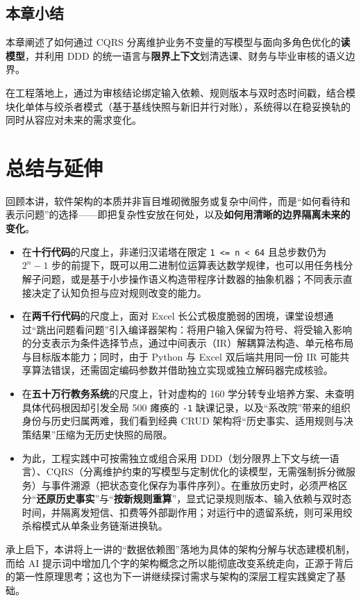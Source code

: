 \documentclass[UTF8,a4paper,11pt,fontset=fandol]{ctexart}
\begin{document}
\subsection{本章小结}

本章阐述了如何通过 CQRS 分离维护业务不变量的写模型与面向多角色优化的\textbf{读模型}，并利用 DDD 的统一语言与\textbf{限界上下文}划清选课、财务与毕业审核的语义边界。

在工程落地上，通过为审核结论绑定输入依赖、规则版本与双时态时间戳，结合模块化单体与绞杀者模式（基于基线快照与新旧并行对账），系统得以在稳妥换轨的同时从容应对未来的需求变化。

\section{总结与延伸}

回顾本讲，软件架构的本质并非盲目堆砌微服务或复杂中间件，而是“如何看待和表示问题”的选择——即把复杂性安放在何处，以及\textbf{如何用清晰的边界隔离未来的变化}。

\begin{itemize}
\item 在\textbf{十行代码}的尺度上，非递归汉诺塔在限定 \texttt{1 <= n < 64} 且总步数仍为 \(2^n - 1\) 步的前提下，既可以用二进制位运算表达数学规律，也可以用任务栈分解子问题，或是基于小步操作语义构造带程序计数器的抽象机器；不同表示直接决定了认知负担与应对规则改变的能力。

\item 在\textbf{两千行代码}的尺度上，面对 Excel 长公式极度脆弱的困境，课堂设想通过“跳出问题看问题”引入编译器架构：将用户输入保留为符号、将受输入影响的分支表示为条件选择节点，通过中间表示（IR）解耦算法构造、单元格布局与目标版本能力；同时，由于 Python 与 Excel 双后端共用同一份 IR 可能共享算法错误，还需固定编码参数并借助独立实现或独立解码器完成核验。

\item 在\textbf{五十万行教务系统}的尺度上，针对虚构的 160 学分转专业培养方案、未查明具体代码根因却引发全局 500 瘫痪的 \texttt{-1} 缺课记录，以及“系改院”带来的组织身份与历史归属两难，我们看到经典 CRUD 架构将“历史事实、适用规则与决策结果”压缩为无历史快照的局限。

\item 为此，工程实践中可按需独立或组合采用 DDD（划分限界上下文与统一语言）、CQRS（分离维护约束的写模型与定制优化的读模型，无需强制拆分微服务）与事件溯源（把状态变化保存为事件序列）。在重放历史时，必须严格区分“\textbf{还原历史事实}”与“\textbf{按新规则重算}”，显式记录规则版本、输入依赖与双时态时间，并隔离发短信、扣费等外部副作用；对运行中的遗留系统，则可采用绞杀榕模式从单条业务链渐进换轨。

\end{itemize}
承上启下，本讲将上一讲的“数据依赖图”落地为具体的架构分解与状态建模机制，而给 AI 提示词中增加几个字的架构概念之所以能彻底改变系统走向，正源于背后的第一性原理思考；这也为下一讲继续探讨需求与架构的深层工程实践奠定了基础。
\end{document}

